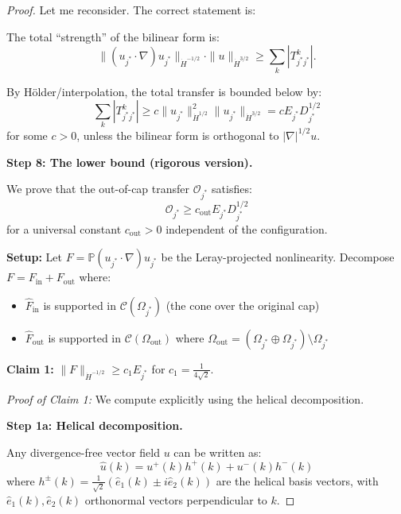 \documentclass[11pt]{article}
\theoremstyle{definition}
\begin{document}
\begin{proof}
Let me reconsider. The correct statement is:

The total ``strength'' of the bilinear form is:
\begin{equation}
\|(u_{j^*} \cdot \nabla)u_{j^*}\|_{\dot{H}^{-1/2}} \cdot \|u\|_{\dot{H}^{3/2}} \geq \sum_k |T_{j^* j^*}^k|.
\end{equation}

By Hölder/interpolation, the total transfer is bounded below by:
\begin{equation}
\sum_k |T_{j^* j^*}^k| \geq c \|u_{j^*}\|_{\dot{H}^{1/2}}^2 \|u_{j^*}\|_{\dot{H}^{3/2}} = c E_{j^*} D_{j^*}^{1/2}
\end{equation}
for some $c > 0$, unless the bilinear form is orthogonal to $|\nabla|^{1/2} u$.

\textbf{Step 8: The lower bound (rigorous version).}

We prove that the out-of-cap transfer $\mathcal{O}_{j^*}$ satisfies:
\begin{equation}
\mathcal{O}_{j^*} \geq c_{\text{out}} E_{j^*} D_{j^*}^{1/2}
\end{equation}
for a universal constant $c_{\text{out}} > 0$ independent of the configuration.

\textbf{Setup:} Let $F = \mathbb{P}(u_{j^*} \cdot \nabla)u_{j^*}$ be the Leray-projected nonlinearity. Decompose $F = F_{\text{in}} + F_{\text{out}}$ where:
\begin{itemize}
\item $\hat{F}_{\text{in}}$ is supported in $\mathcal{C}(\Omega_{j^*})$ (the cone over the original cap)
\item $\hat{F}_{\text{out}}$ is supported in $\mathcal{C}(\Omega_{\text{out}})$ where $\Omega_{\text{out}} = (\Omega_{j^*} \oplus \Omega_{j^*}) \setminus \Omega_{j^*}$
\end{itemize}

\textbf{Claim 1:} $\|F\|_{\dot{H}^{-1/2}} \geq c_1 E_{j^*}$ for $c_1 = \frac{1}{4\sqrt{2}}$.

\textit{Proof of Claim 1:} We compute explicitly using the helical decomposition.

\textbf{Step 1a: Helical decomposition.}

Any divergence-free vector field $u$ can be written as:
\begin{equation}
\hat{u}(k) = u^+(k) h^+(k) + u^-(k) h^-(k)
\end{equation}
where $h^\pm(k) = \frac{1}{\sqrt{2}}(\hat{e}_1(k) \pm i\hat{e}_2(k))$ are the helical basis vectors, with $\hat{e}_1(k), \hat{e}_2(k)$ orthonormal vectors perpendicular to $k$.


\end{proof}
\end{document}
